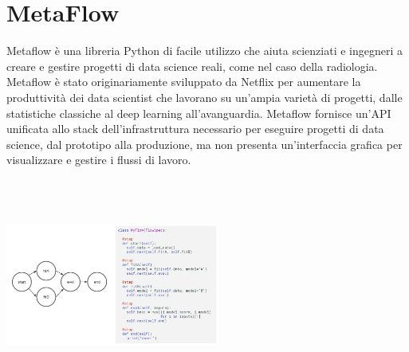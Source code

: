\documentclass[12pt,a4paper]{report}
\begin{document}
\section{MetaFlow}
Metaflow è una libreria Python di facile utilizzo che aiuta scienziati e ingegneri a creare e gestire progetti di data science reali, come nel caso della radiologia. Metaflow è stato originariamente sviluppato da Netflix per aumentare la produttività dei data scientist che lavorano su un'ampia varietà di progetti, dalle statistiche classiche al deep learning all'avanguardia.
Metaflow fornisce un'API unificata allo stack dell'infrastruttura necessario per eseguire progetti di data science, dal prototipo alla produzione, ma non presenta un'interfaccia grafica per visualizzare e gestire i flussi di lavoro.

\begin{center}
    \includegraphics[width=7cm,height=7cm,keepaspectratio]{MetaFlow}
\end{center}
\end{document}
